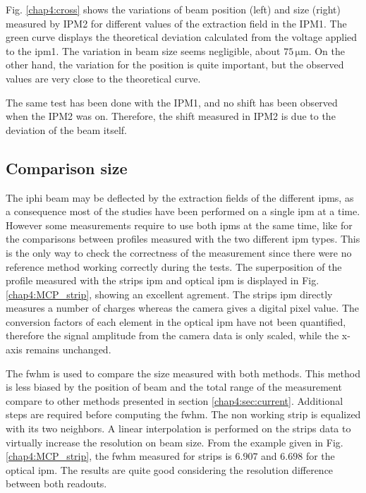 \begin{refsection}
  Fig. \ref{chap4:cross} shows the variations of beam position (left) and size (right) measured by IPM2 for different values of the extraction field in the IPM1. The green curve displays the theoretical deviation calculated from the voltage applied to the \acrshort{ipm}1. The variation in beam size seems negligible, about $75\,\mathrm{\mu m}$. On the other hand, the variation for the position is quite important, but the observed values are very close to the theoretical curve.

  The same test has been done with the IPM1, and no shift has been observed when the IPM2 was on. Therefore, the shift measured in IPM2 is due to the deviation of the beam itself.

  \subsection{Comparison size }
  The \acrshort{iphi} beam may be deflected by the extraction fields of the different \acrshort{ipm}s, as a consequence most of the studies have been performed on a single \acrshort{ipm} at a time. However some measurements require to use both \acrshort{ipm}s at the same time, like for the comparisons between profiles measured with the two different \acrshort{ipm} types. This is the only way to check the correctness of the measurement since there were no reference method working correctly during the tests.
  The superposition of the profile measured with the strips \acrshort{ipm} and optical \acrshort{ipm} is displayed in Fig. \ref{chap4:MCP_strip}, showing an excellent agrement. The strips \acrshort{ipm} directly measures a number of charges whereas the camera gives a digital pixel value. The conversion factors of each element in the optical \acrshort{ipm} have not been quantified, therefore the signal amplitude from the camera data is only scaled, while the x-axis remains unchanged.
  

  The \acrshort{fwhm} is used to compare the size measured with both methods. This method is less biased by the position of beam and the total range of the measurement
  compare to other methods presented in section \ref{chap4:sec:current}.
  Additional steps are required before computing the \acrshort{fwhm}.
  The non working strip is equalized with its two neighbors. A linear interpolation is performed on the strips data to virtually increase the resolution on beam size. From the example given in Fig. \ref{chap4:MCP_strip}, the \acrshort{fwhm} measured for strips is $6.907$ and $6.698$ for the optical \acrshort{ipm}.
  The results are quite good considering the resolution difference between both readouts.


\end{refsection}
